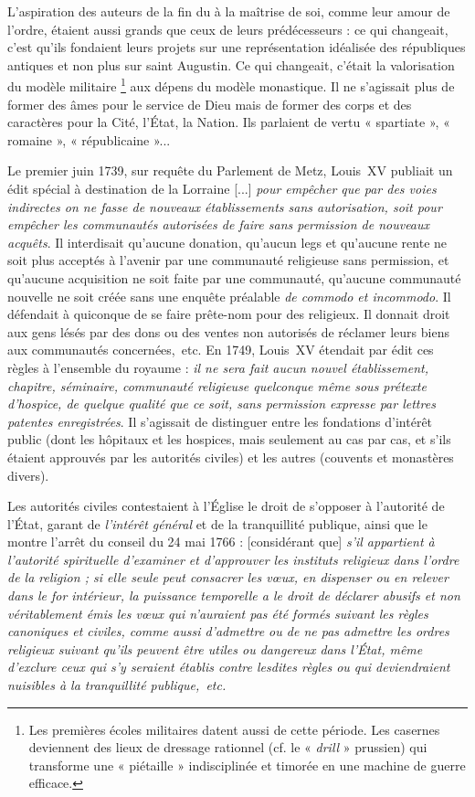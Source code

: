  L'aspiration des auteurs de la fin du  à la maîtrise de soi, comme leur amour de l'ordre, étaient aussi grands que ceux de leurs prédécesseurs : ce qui changeait, c'est qu'ils fondaient leurs projets sur une représentation idéalisée des républiques antiques et non plus sur saint Augustin. Ce qui changeait, c'était la valorisation du modèle militaire%
\footnote{Les premières écoles militaires datent aussi de cette période. Les casernes deviennent des lieux de dressage rationnel (cf. le « \emph{drill} » prussien) qui transforme une « piétaille » indisciplinée et timorée en une machine de guerre efficace.} 
aux dépens du modèle monastique. Il ne s'agissait plus de former des âmes pour le service de Dieu mais de former des corps et des caractères pour la Cité, l'État, la Nation. Ils parlaient de vertu « spartiate », « romaine », « républicaine »...

 Le premier juin 1739, sur requête du Parlement de Metz, Louis~XV publiait un édit spécial à destination de la Lorraine {[...] \emph{pour empêcher que par des voies indirectes on ne fasse de nouveaux établissements sans autorisation, soit pour empêcher les communautés autorisées de faire sans permission de nouveaux acquêts}}. Il interdisait qu'aucune donation, qu'aucun legs et qu'aucune rente ne soit plus acceptés à l'avenir par une communauté religieuse sans permission, et qu'aucune acquisition ne soit faite par une communauté, qu'aucune communauté nouvelle ne soit créée sans une enquête préalable \emph{de commodo et incommodo}. Il défendait à quiconque de se faire prête-nom pour des religieux. Il donnait droit aux gens lésés par des dons ou des ventes non autorisés de réclamer leurs biens aux communautés concernées,~etc. En 1749, Louis~XV étendait par édit ces règles à l'ensemble du royaume : \emph{il ne sera fait aucun nouvel établissement, chapitre, séminaire, communauté religieuse quelconque même sous prétexte d'hospice, de quelque qualité que ce soit, sans permission expresse par lettres patentes enregistrées}. Il s'agissait de distinguer entre les fondations d'intérêt public (dont les hôpitaux et les hospices, mais seulement au cas par cas, et s'ils étaient approuvés par les autorités civiles) et les autres (couvents et monastères divers). 

 Les autorités civiles contestaient à l'Église le droit de s'opposer à l'autorité de l'État, garant de \emph{l'intérêt général} et de la tranquillité publique, ainsi que le montre l'arrêt du conseil du 24 mai 1766 : [considérant que] \emph{s'il appartient à l'autorité spirituelle d'examiner et d'approuver les instituts religieux dans l'ordre de la religion ; si elle seule peut consacrer les vœux, en dispenser ou en relever dans le for intérieur, la puissance temporelle a le droit de déclarer abusifs et non véritablement émis les vœux qui n'auraient pas été formés suivant les règles canoniques et civiles, comme aussi d'admettre ou de ne pas admettre les ordres religieux suivant qu'ils peuvent être utiles ou dangereux dans l'État, même d'exclure ceux qui s'y seraient établis contre lesdites règles ou qui deviendraient nuisibles à la tranquillité publique,~etc.}

